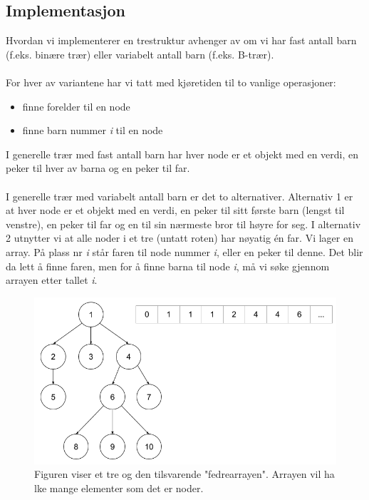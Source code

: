 \subsection{Implementasjon}
Hvordan vi implementerer en trestruktur avhenger av om vi har fast antall barn (f.eks. binære trær) eller variabelt antall barn (f.eks. B-trær).
\\\\
For hver av variantene har vi tatt med kjøretiden til to vanlige operasjoner:
\begin{itemize}
    \item finne forelder til en node
    \item finne barn nummer \textit{i} til en node
\end{itemize}

\noindent I generelle trær med fast antall barn har hver node er et objekt med en verdi, en peker til hver av barna og en peker til far.
\\\\
I generelle trær med variabelt antall barn er det to alternativer. Alternativ 1 er at hver node er et objekt med en verdi, en peker til sitt første barn (lengst til venstre), en peker til far og en til sin nærmeste bror til høyre for seg. I alternativ 2 utnytter vi at alle noder i et tre (untatt roten) har nøyatig én far. Vi lager en array. På plass nr \textit{i} står faren til node nummer \textit{i}, eller en peker til denne. Det blir da lett å finne faren, men for å finne barna til node \textit{i}, må vi søke gjennom arrayen etter tallet \textit{i}.

\begin{figure}[H]
\includegraphics[scale=0.6]{images/fedrearray}
\centering %
\caption{Figuren viser et tre og den tilsvarende "fedrearrayen". Arrayen vil ha lke mange elementer som det er noder.}
\label{fig:fedrearray}
\end{figure}


